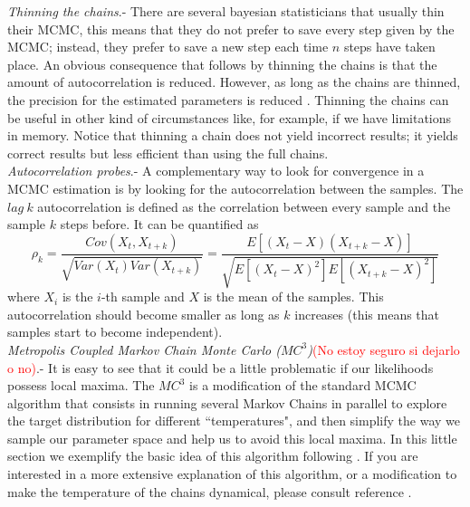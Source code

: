 \documentclass[onecolumn,           %
               showpacs,            %
               preprintnumbers,     %
               aps,                 %
               prl,          	    %
               letterpaper,             %
               superscriptaddress,      %
               nofootinbib,         %
               tightenlines,        %
               floats,floatfix      %
               ,usenatbib,
               ]{revtex4-1}
\begin{document}
 \textit{Thinning the chains}.- There are several bayesian statisticians that usually thin their MCMC, this means that they do not prefer to save every step given by the MCMC; instead, they prefer to save a new step each time $n$ steps have taken place. An obvious consequence that follows by thinning the chains is that the amount of autocorrelation is reduced. However, as long as the chains are thinned, the precision for the estimated parameters is reduced \cite{thin}. Thinning the chains can be useful in other kind of circumstances like, for example, if we have limitations in memory. Notice that thinning a chain does not yield incorrect results; it yields correct results but less efficient than using the full chains.       
\\

\textit{Autocorrelation probes}.- A complementary way to look for convergence in a MCMC estimation is by looking for the autocorrelation between the samples. The $lag\ k$ autocorrelation is defined as the correlation between every sample and the sample $k$ steps before. It can be quantified as \cite{autocor}
\begin{equation}
\rho_k=\frac{Cov(X_t,X_{t+k})}{\sqrt{Var(X_t)Var(X_{t+k})}}=\frac{E[(X_t-X)(X_{t+k}-X)]}{\sqrt{E[(X_t-X)^2]E[(X_{t+k}-X)^2]}}
\end{equation}
where $X_i$ is the $i$-th sample and $X$ is the mean of the samples. This autocorrelation should become smaller as long as $k$ increases (this means that samples start to become independent).\\

\textit{Metropolis Coupled Markov Chain Monte Carlo ($MC^3$)}\textcolor{red}{(No estoy seguro si dejarlo o no)}.- It is easy to see that it could be a little problematic if our likelihoods possess local maxima. The $MC^3$ is a modification of the standard MCMC algorithm that consists in running several Markov Chains in parallel to explore the target distribution for different  ``temperatures", and then simplify the way we sample our parameter space and help us to avoid this local maxima. In this little section we exemplify the basic idea of this algorithm following \cite{mcmcmc}. If you are interested in a more extensive explanation of this algorithm, or a modification to make the temperature of the chains dynamical, please consult reference \cite{mcmcmc}.
\end{document}
